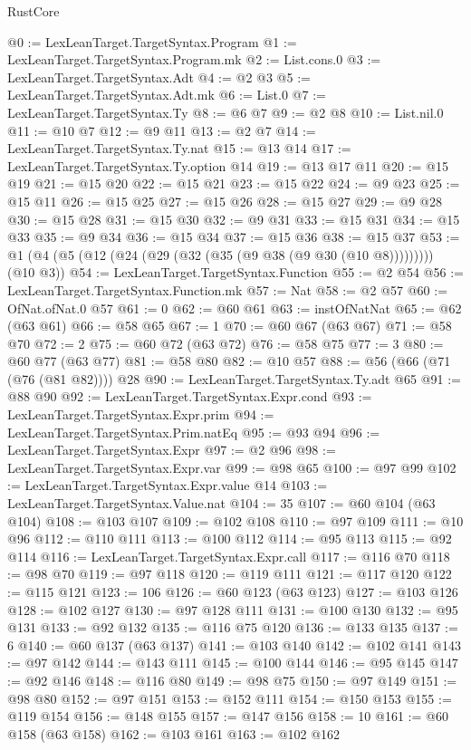 \begin{lexlean}{RustCore}
\begin{coremodule}
@0 := LexLeanTarget.TargetSyntax.Program
@1 := LexLeanTarget.TargetSyntax.Program.mk
@2 := List.cons.{0}
@3 := LexLeanTarget.TargetSyntax.Adt
@4 := @2 @3
@5 := LexLeanTarget.TargetSyntax.Adt.mk
@6 := List.{0}
@7 := LexLeanTarget.TargetSyntax.Ty
@8 := @6 @7
@9 := @2 @8
@10 := List.nil.{0}
@11 := @10 @7
@12 := @9 @11
@13 := @2 @7
@14 := LexLeanTarget.TargetSyntax.Ty.nat
@15 := @13 @14
@17 := LexLeanTarget.TargetSyntax.Ty.option @14
@19 := @13 @17 @11
@20 := @15 @19
@21 := @15 @20
@22 := @15 @21
@23 := @15 @22
@24 := @9 @23
@25 := @15 @11
@26 := @15 @25
@27 := @15 @26
@28 := @15 @27
@29 := @9 @28
@30 := @15 @28
@31 := @15 @30
@32 := @9 @31
@33 := @15 @31
@34 := @15 @33
@35 := @9 @34
@36 := @15 @34
@37 := @15 @36
@38 := @15 @37
@53 := @1 (@4 (@5 (@12 (@24 (@29 (@32 (@35 (@9 @38 (@9 @30 (@10 @8))))))))) (@10 @3))
@54 := LexLeanTarget.TargetSyntax.Function
@55 := @2 @54
@56 := LexLeanTarget.TargetSyntax.Function.mk
@57 := Nat
@58 := @2 @57
@60 := OfNat.ofNat.{0} @57
@61 := 0
@62 := @60 @61
@63 := instOfNatNat
@65 := @62 (@63 @61)
@66 := @58 @65
@67 := 1
@70 := @60 @67 (@63 @67)
@71 := @58 @70
@72 := 2
@75 := @60 @72 (@63 @72)
@76 := @58 @75
@77 := 3
@80 := @60 @77 (@63 @77)
@81 := @58 @80
@82 := @10 @57
@88 := @56 (@66 (@71 (@76 (@81 @82)))) @28
@90 := LexLeanTarget.TargetSyntax.Ty.adt @65
@91 := @88 @90
@92 := LexLeanTarget.TargetSyntax.Expr.cond
@93 := LexLeanTarget.TargetSyntax.Expr.prim
@94 := LexLeanTarget.TargetSyntax.Prim.natEq
@95 := @93 @94
@96 := LexLeanTarget.TargetSyntax.Expr
@97 := @2 @96
@98 := LexLeanTarget.TargetSyntax.Expr.var
@99 := @98 @65
@100 := @97 @99
@102 := LexLeanTarget.TargetSyntax.Expr.value @14
@103 := LexLeanTarget.TargetSyntax.Value.nat
@104 := 35
@107 := @60 @104 (@63 @104)
@108 := @103 @107
@109 := @102 @108
@110 := @97 @109
@111 := @10 @96
@112 := @110 @111
@113 := @100 @112
@114 := @95 @113
@115 := @92 @114
@116 := LexLeanTarget.TargetSyntax.Expr.call
@117 := @116 @70
@118 := @98 @70
@119 := @97 @118
@120 := @119 @111
@121 := @117 @120
@122 := @115 @121
@123 := 106
@126 := @60 @123 (@63 @123)
@127 := @103 @126
@128 := @102 @127
@130 := @97 @128 @111
@131 := @100 @130
@132 := @95 @131
@133 := @92 @132
@135 := @116 @75 @120
@136 := @133 @135
@137 := 6
@140 := @60 @137 (@63 @137)
@141 := @103 @140
@142 := @102 @141
@143 := @97 @142
@144 := @143 @111
@145 := @100 @144
@146 := @95 @145
@147 := @92 @146
@148 := @116 @80
@149 := @98 @75
@150 := @97 @149
@151 := @98 @80
@152 := @97 @151
@153 := @152 @111
@154 := @150 @153
@155 := @119 @154
@156 := @148 @155
@157 := @147 @156
@158 := 10
@161 := @60 @158 (@63 @158)
@162 := @103 @161
@163 := @102 @162

\end{coremodule}
\end{lexlean}
